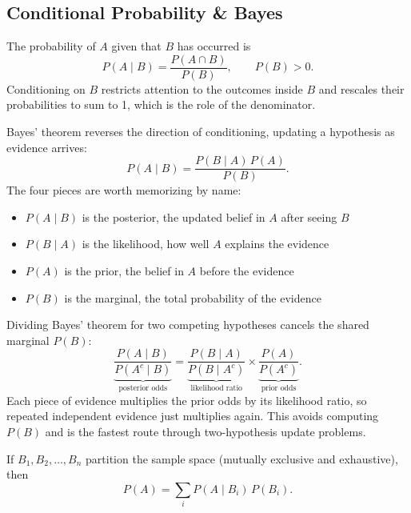 \subsection{Conditional Probability \& Bayes}

\begin{definition}
The probability of $A$ given that $B$ has occurred is
\[
P(A \mid B) = \frac{P(A \cap B)}{P(B)}, \qquad P(B) > 0.
\]
Conditioning on $B$ restricts attention to the outcomes inside $B$ and rescales their probabilities to sum to 1, which is the role of the denominator.
\end{definition}

\begin{theorem}
Bayes' theorem reverses the direction of conditioning, updating a hypothesis as evidence arrives:
\[
P(A \mid B) = \frac{P(B \mid A) \, P(A)}{P(B)}.
\]
The four pieces are worth memorizing by name:
\begin{itemize}[itemsep=-1ex, label=--]
  \item $P(A \mid B)$ is the posterior, the updated belief in $A$ after seeing $B$
  \item $P(B \mid A)$ is the likelihood, how well $A$ explains the evidence
  \item $P(A)$ is the prior, the belief in $A$ before the evidence
  \item $P(B)$ is the marginal, the total probability of the evidence
\end{itemize}
\end{theorem}

\begin{keybox}
Dividing Bayes' theorem for two competing hypotheses cancels the shared marginal $P(B)$:
\[
\underbrace{\frac{P(A \mid B)}{P(A^c \mid B)}}_{\text{posterior odds}}
= \underbrace{\frac{P(B \mid A)}{P(B \mid A^c)}}_{\text{likelihood ratio}}
\times \underbrace{\frac{P(A)}{P(A^c)}}_{\text{prior odds}}.
\]
Each piece of evidence multiplies the prior odds by its likelihood ratio, so repeated independent evidence just multiplies again. This avoids computing $P(B)$ and is the fastest route through two-hypothesis update problems.
\end{keybox}

\medskip

\begin{theorem}
If $B_1, B_2, \dots , B_n$ partition the sample space (mutually exclusive and exhaustive), then
\[
P(A) = \sum_i P(A \mid B_i) \, P(B_i).
\]
\end{theorem}

